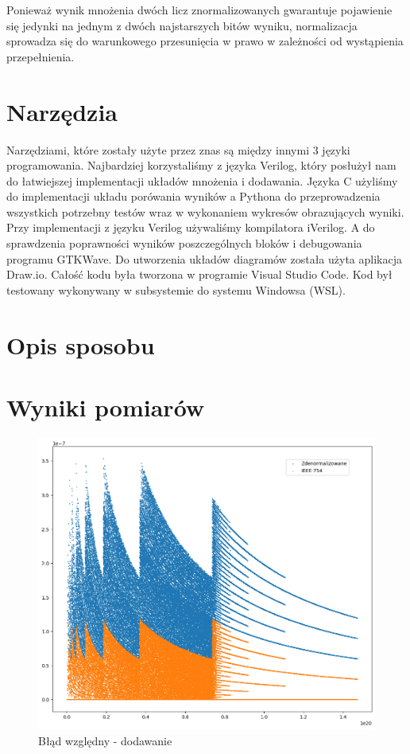 \documentclass{article}
\begin{document}
Ponieważ wynik mnożenia dwóch licz znormalizowanych gwarantuje pojawienie się jedynki na jednym z dwóch najstarszych bitów wyniku, normalizacja sprowadza się do warunkowego przesunięcia w prawo w zależności od wystąpienia przepełnienia.


\section{Narzędzia}
Narzędziami, które zostały użyte przez znas są między innymi 3 języki programowania. Najbardziej korzystaliśmy z języka Verilog, który posłużył nam do łatwiejszej implementacji układów mnożenia i dodawania.
Języka C użyliśmy do implementacji układu porówania wyników a Pythona do przeprowadzenia wszystkich potrzebny testów wraz w wykonaniem wykresów obrazujących wyniki.
Przy implementacji z języku Verilog używaliśmy kompilatora iVerilog.
A do sprawdzenia poprawności wyników poszczególnych bloków i debugowania programu GTKWave.
Do utworzenia układów diagramów została użyta aplikacja Draw.io.
Całość kodu była tworzona w programie Visual Studio Code.
Kod był testowany wykonywany w subsystemie do systemu Windowsa (WSL).



\section{Opis sposobu}

\section{Wyniki pomiarów}
\begin{figure}[H]
	\centering
	\includegraphics[height=0.4\textheight]{figures/add_relative.png}
	\caption{Błąd względny - dodawanie}
	\label{fig:add_relative}
\end{figure}
\end{document}
